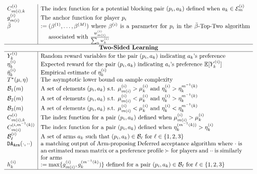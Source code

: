 \documentclass{article}
\newcommand{\E}{\mathbb{E}}
\begin{document}
$$\begin{array}{l|l}
C_{m(i),k}^{(i)} & \text{The index function for a potential blocking pair $(p_i, a_k$) defined when $a_k\in \mathcal{E}_m^{(i)}$}  \\
g_{m(i)}^{(i)} & \text{The anchor function for player } p_i \\
\Bar{\beta} & :=\parbox[t]{12cm}{$(\beta^{(1)},\ldots, \beta^{(M)})$ where $\beta^{(i)}$ is a parameter for $p_i$ in the $\Bar{\beta}$-Top-Two algorithm associated with $\frac{w^{(i)}_{m(i)}}{\sum_kw^{(i)}_k}$} \\
\hline
\multicolumn{2}{c}{\textbf{Two-Sided Learning}} \\
\hline
Y_k^{(i)} & \text{Random reward variables for the pair $(p_i, a_k)$ indicating $a_k$'s preference}  \\
\eta^{(i)}_k & \text{Expected reward for the pair $(p_i, a_k)$ indicating $a_i$'s preference}\ \E[Y_k^{(i)}] \\
\hat{\eta}^{(i)}_k & \text{Empirical estimate of $\eta^{(i)}_k$}\\
T^{\star}(\mu,\eta) & \text{The asymptotic lower bound on sample complexity} \\
\mathcal{B}_1(m) & \text{A set of elements $(p_i,a_k)$ s.t. $\mu^{(i)}_{m(i)}>\mu^{(i)}_{k}$ and $\eta^{(i)}_k>\eta^{m^{-1}(k)}_k$}\\
\mathcal{B}_2(m) & \text{A set of elements $(p_i,a_k)$ s.t. $\mu^{(i)}_{m(i)}<\mu^{(i)}_{k}$ and $\eta^{(i)}_k>\eta^{m^{-1}(k)}_k$}\\
\mathcal{B}_3(m) & \text{A set of elements $(p_i,a_k)$ s.t. $\mu^{(i)}_{m(i)}<\mu^{(i)}_{k}$ and $\eta^{(i)}_k<\eta^{m^{-1}(k)}_k$}\\
C_{m(i),k}^{(i)} & \text{The index function for a pair $(p_i, a_k$) defined when $\mu^{(i)}_{m(i)}>\mu^{(i)}_{k}$}  \\
C^{(i,m^{-1}(k))}_{m(i)} & \text{The index function for a pair $(p_i, a_k$) defined when $\eta^{(m^{-1}(k))}_{k}>\eta^{(i)}_{k}$}\\
\mathcal{B}_\ell^{(i)} & \text{A set of arms $a_k$ such that $(p_i,a_k)\in\mathcal{B}_\ell$  for $\ell\in\{1,2,3\}$}\\
\texttt{DA}_{\texttt{Arm}}(\cdot, \cdot\cdot) & \parbox[t]{12cm}{a matching output of Arm-proposing Deferred acceptance algorithm where $\cdot$ is an estimated mean matrix or a preference profile $\succ$ for players and $\cdot\cdot$ is similarly for arms} \\
h^{(i)}_{k} & := \max\{g^{(i)}_{m(i)},g^{(m^{-1}(k)}_k)\}\ \text{defined for a pair $(p_i,a_k)\in \mathcal{B}_{\ell}$ for $\ell\in\{1,2,3\}$} \\
\hline
\end{array}
$$
\end{document}
